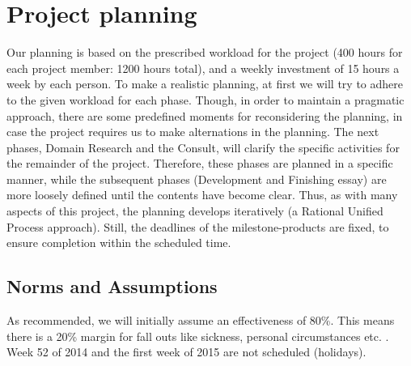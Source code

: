 \documentclass{article}
\begin{document}
\section{Project planning}
% 
Our planning is based on the prescribed workload for the project (400 hours for
each project member: 1200 hours total), and a weekly investment of 15 hours a
week by each person. To make a realistic planning, at first we will try to
adhere to the given workload for each phase.  Though, in order to maintain a
pragmatic approach, there are some predefined moments for reconsidering the
planning, in case the project requires us to make alternations in the
planning. The next phases, Domain Research and the Consult, will clarify the
specific activities for the remainder of the project. Therefore, these phases
are planned in a specific manner, while the subsequent phases (Development and
Finishing essay) are more loosely defined until the contents have become
clear. Thus, as with many aspects of this project, the planning develops
iteratively (a Rational Unified Process approach). Still, the deadlines of the
milestone-products are fixed, to ensure completion within the scheduled time.

\subsection{Norms and Assumptions}
As recommended, we will initially assume an effectiveness of 80\%. This means
there is a 20\% margin for fall outs like sickness, personal circumstances
etc. . Week 52 of 2014 and the first week of 2015 are not scheduled (holidays).
\end{document}
